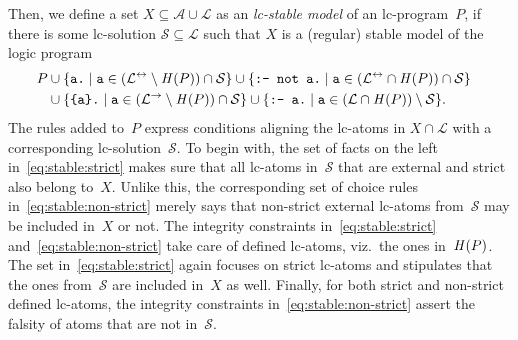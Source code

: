 Then, we define a set $X\subseteq\mathcal{A}\cup\mathcal{L}$
as an \emph{lc-stable model} of an lc-program~$P$,
if
there is some lc-solution $\mathcal{S}\subseteq\mathcal{L}$ such that
$X$ is a (regular) stable model of the logic program
%
\newcommand{\code}[1]{\text{\texttt{#1}}}
%
\begin{align}
\hspace{-10pt}
P
&{}\cup
\{\code{a.}       \mid \code{a}\in (\mathcal{L}^\leftrightarrow\setminus\head{P})\cap \mathcal{S}\}
\cup
\{\code{:- not a.}\mid \code{a}\in (\mathcal{L}^\leftrightarrow\cap\head{P})\cap \mathcal{S}\}
\label{eq:stable:strict}
\\
 &{}\cup
\{\code{\{a\}.}   \mid \code{a}\in (\mathcal{L}^\rightarrow\setminus\head{P})\cap \mathcal{S}\}
\cup
\{\code{:- a.}    \mid \code{a}\in (\mathcal{L}\cap\head{P})\setminus \mathcal{S}\}\rlap{.}
\label{eq:stable:non-strict}
\end{align}
%
The rules added to~$P$ %
express conditions aligning the lc-atoms in $X\cap\mathcal{L}$ with a corresponding lc-solution~$\mathcal{S}$.
%
To begin with, 
the set of facts on the left in~\eqref{eq:stable:strict} makes sure that 
all lc-atoms in~$\mathcal{S}$ that are external and strict %
also belong to~$X$.
%
Unlike this, the corresponding set of choice rules in~\eqref{eq:stable:non-strict}
merely says that non-strict external lc-atoms from~$\mathcal{S}$ may be included in~$X$ or not.
%
The integrity constraints in~\eqref{eq:stable:strict} and~\eqref{eq:stable:non-strict}
take care of defined lc-atoms, viz.\ the ones in~$\mathit{H}(P)$.
%
The set in~\eqref{eq:stable:strict} again focuses on strict lc-atoms and
stipulates that the ones from~$\mathcal{S}$ are included in~$X$ as well.
%
Finally, for both strict and non-strict defined lc-atoms,
the integrity constraints in~\eqref{eq:stable:non-strict} assert the falsity
of atoms that are not in~$\mathcal{S}$.

